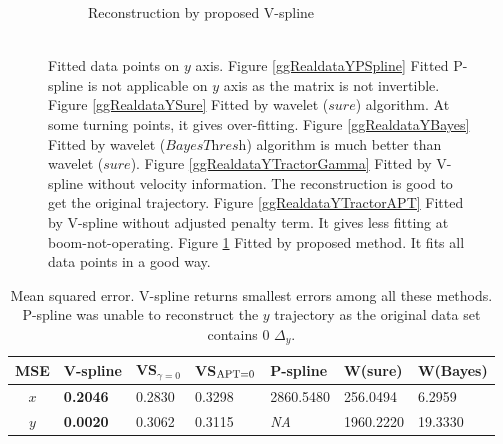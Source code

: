\begin{figure}
\begin{subfigure}{0.45\textwidth}
    \caption{Reconstruction by proposed V-spline\\ \mbox{  }}\label{ggRealdataYTractor}
    \end{subfigure}
\caption{Fitted data points on $y$ axis. Figure \ref{ggRealdataYPSpline} Fitted P-spline is not applicable on $y$ axis as the matrix is not invertible. Figure \ref{ggRealdataYSure} Fitted by wavelet ($\textit{sure}$) algorithm. At some turning points, it gives over-fitting. Figure \ref{ggRealdataYBayes} Fitted by wavelet ($\textit{BayesThresh}$) algorithm is much better than wavelet ($\textit{sure}$). Figure \ref{ggRealdataYTractorGamma} Fitted by V-spline without velocity information. The reconstruction is good to get the original trajectory. Figure \ref{ggRealdataYTractorAPT} Fitted by V-spline without adjusted penalty term. It gives less fitting at boom-not-operating. Figure \ref{ggRealdataYTractor} Fitted by proposed method. It fits all data points in a good way.}\label{1dy}
 \end{figure}

\begin{table}
\caption{Mean squared error. V-spline returns smallest errors among all these methods. P-spline was unable to reconstruct the $y$ trajectory as the original data set contains 0 $\Delta_y$.} \label{1dxymse}
	\setlength\tabcolsep{1.5pt}
\begin{center}
 	\begin{tabular}{|c|C{2cm}|C{2cm}|C{2cm}|C{2cm}|C{2cm}|C{2cm}|}
 		\hline
 		MSE   &  V-spline & VS$_{\gamma=0}$ & VS$_{\scriptsize \mbox{APT=0}}$  & P-spline &  W(sure) & W(Bayes)\\ \hline 
	\textit{$x$}   &  \textbf{0.2046} & 0.2830 & 0.3298     & 2860.5480   & 256.0494  & 6.2959  \\ \hline
	\textit{$y$}   &  \textbf{0.0020} & 0.3062 & 0.3115     & \textit{NA} & 1960.2220 & 19.3330  \\ \hline
 	\end{tabular}
 \end{center}
\end{table}

